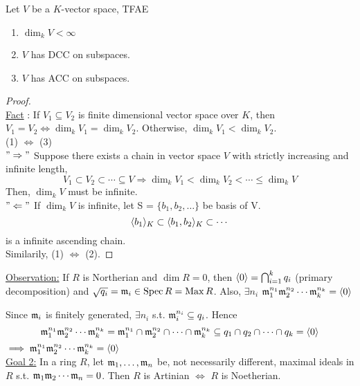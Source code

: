 \begin{lemma} \label{vector-space-dim-acc-dcc-relation}
  Let $V$ be a $K$-vector space, TFAE
  \begin{enumerate}[(1)]
    \item $\dim_k V < \infty$
    \item $V$ has DCC on subspaces.
    \item $V$ has ACC on subspaces.
  \end{enumerate}

  \begin{proof} $ $ \\
    \underline{Fact} : If $V_1 \subseteq V_2$ is finite dimensional vector space
    over $K$, then $V_1 = V_2 \iff \dim_k V_1 = \dim_k V_2$. Otherwise, $\dim_k V_1 < \dim_k V_2$. \\
    (1) $\Leftrightarrow$ (3) \\
    $"\Rightarrow"$ Suppose there exists a chain in vector space $V$ with strictly
    increasing and infinite length,
    $$
      V_1 \subset V_2 \subset \cdots \subseteq V \Rightarrow \dim_k V_1 < \dim_k V_2 < \cdots 
      \leq \dim_k V
    $$
    Then, $\dim_k V$ must be infinite. \\
    $"\Leftarrow"$ If $\dim_k V$ is infinite, let S = $\{b_1, b_2, \dots \}$ be basis of V.
    $$
      \langle b_1\rangle_K \subset \langle b_1 , b_2\rangle_K \subset \cdots
    $$
    is a infinite ascending chain.\\
    Similarily, (1) $\Leftrightarrow$ (2).
  \end{proof}
\end{lemma}

\underline{Observation:} If $R$ is Northerian and $\dim R = 0$, then
$\langle0\rangle = \bigcap_{i=1}^k q_i$ (primary decomposition) and
$\sqrt{q_i} = \mathfrak{m}_i \in \operatorname{Spec} R = \operatorname{Max} R$. Also,  $\exists n_i $ 
$\mathfrak{m}_1^{n_1}\mathfrak{m}_2^{n_2} \dotsm \mathfrak{m}_k^{n_k} = \langle0\rangle$


Since $\mathfrak{m}_i$ is finitely generated, $\exists n_i$ s.t.
$\mathfrak{m}_i^{n_i} \subseteq q_i$. Hence 
$$
\mathfrak{m}_1^{n_1}\mathfrak{m}_2^{n_2} \dotsm \mathfrak{m}_k^{n_k} = 
\mathfrak{m}_1^{n_1} \cap \mathfrak{m}_2^{n_2} \cap \dotsm \cap \mathfrak{m}_k^{n_k} \subseteq
q_1 \cap q_2 \cap \dotsm \cap q_k = \langle0\rangle \\
$$
$\implies \mathfrak{m}_1^{n_1}\mathfrak{m}_2^{n_2} \dotsm \mathfrak{m}_k^{n_k} = \langle0\rangle$ \\

\underline{Goal 2:} In a ring $R$, let $\mathfrak{m}_1, \dots, \mathfrak{m}_n$ be,
not necessarily different, maximal ideals in $R$ s.t.
$\mathfrak{m}_1\mathfrak{m}_2 \dotsm \mathfrak{m}_n = 0$. Then $R$ is Artinian $\iff$ $R$ is Noetherian.

